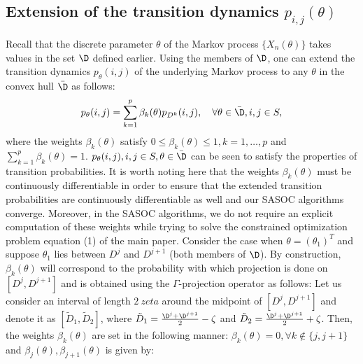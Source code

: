\documentclass[11pt,letterpaper,english]{article}
\begin{document}
\subsection*{Extension of the transition dynamics $p_{i,j}(\theta)$}
Recall that the discrete parameter $\theta$ of the Markov process $\{X_n(\theta)\}$ takes values in the set $\D$ defined earlier. Using the members of $\D$, one can extend the transition dynamics $p_\theta(i,j)$ of the underlying Markov process to any $\theta$ in the convex hull $\bar\D$ as follows:
\begin{equation}
     p_\theta(i,j) = \sum\limits_{k=1}^{p} \beta_k(\theta) p_{D^k}(i,j), \quad \forall \theta \in \bar\D, i,j \in S,
\label{eq:pthetabar}
\end{equation}
where the weights $\beta_k(\theta)$ satisfy $0 \le \beta_k(\theta) \le 1, k=1,\ldots,p$ and $\sum\limits_{k=1}^{p} \beta_k(\theta) = 1$. $p_\theta(i,j), i,j \in S, \theta \in \bar\D$ can be seen to satisfy the properties of transition probabilities. It is worth noting here that the weights $\beta_k(\theta)$ must be continuously differentiable in order to ensure that the extended transition probabilities are continuously differentiable as well and our SASOC algorithms converge. Moreover, in the SASOC algorithms, we do not require an explicit computation of these weights while trying to solve the constrained optimization problem equation (1) of the main paper. Consider the case when $\theta = (\theta_1)^T$ and suppose $\theta_1$ lies between $D^j$ and $D^{j+1}$ (both members of $\D$). By construction, $\beta_k(\theta)$ will correspond to the probability with which projection is done on $[D^j,D^{j+1}]$ and is obtained using the $\Gamma$-projection operator as follows:  Let us consider an interval of length $2 \
zeta$ around the midpoint of $[D^j, D^{j+1}]$ and denote it as $[\tilde D_1, \tilde D_2]$, where $\tilde D_1 = \frac{\D^j+\D^{j+1}}{2} - \zeta$ and $\tilde D_2 = \frac{\D^j+\D^{j+1}}{2} + \zeta$.
Then, the weights $\beta_k(\theta)$ are set in the following manner:
$\beta_k(\theta) = 0, \forall k \notin \{j,j+1\}$ and $\beta_j(\theta), \beta_{j+1}(\theta)$ is given by: 
\end{document}
